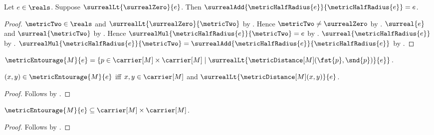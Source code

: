 \begin{proposition}\label{metric_half_radius_double}
    Let $e\in\reals$.
    Suppose $\surrealLt{\surrealZero}{e}$.
    Then
        $\surrealAdd{\metricHalfRadius{e}}{\metricHalfRadius{e}}=e$.
\end{proposition}
\begin{proof}
    $\metricTwo\in\reals$ and
        $\surrealLt{\surrealZero}{\metricTwo}$
        by .
    Hence $\metricTwo\neq\surrealZero$
        by .
    $\surreal{e}$ and $\surreal{\metricTwo}$
        by .
    Hence
        $\surrealMul{\metricHalfRadius{e}}{\metricTwo}=e$
        by
        .
    $\surreal{\metricHalfRadius{e}}$
        by
        .
    $\surrealMul{\metricHalfRadius{e}}{\metricTwo}
        =\surrealAdd{\metricHalfRadius{e}}{\metricHalfRadius{e}}$
        by
        .
\end{proof}

\begin{definition}\label{metric_entourage}
    $\metricEntourage{M}{e}=
        \{p\in\carrier[M]\times\carrier[M]\mid
            \surrealLt
                {\metricDistance[M](\fst{p},\snd{p})}{e}\}$.
\end{definition}

\begin{proposition}\label{metric_entourage_iff}
    $(x,y)\in\metricEntourage{M}{e}$ iff
        $x,y\in\carrier[M]$ and
        $\surrealLt{\metricDistance[M](x,y)}{e}$.
\end{proposition}
\begin{proof}
    Follows by
        .
\end{proof}

\begin{proposition}\label{metric_entourage_type}
    $\metricEntourage{M}{e}
        \subseteq\carrier[M]\times\carrier[M]$.
\end{proposition}
\begin{proof}
    Follows by .
\end{proof}

